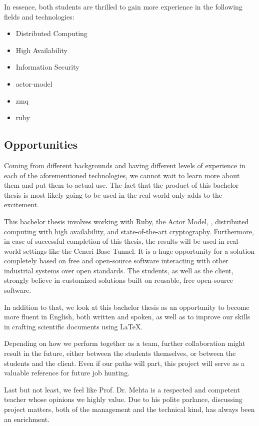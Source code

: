 In essence, both students are thrilled to gain more experience in the following
fields and technologies:

\begin{itemize}
	\item Distributed Computing
	\item High Availability
	\item Information Security
	\item \gls{actor-model}
	\item \gls{zmq}
	\item \gls{ruby}
\end{itemize}

\subsection{Opportunities}
Coming from different backgrounds and having different levels of experience in
each of the aforementioned technologies, we cannot wait to learn more about them and put
them to actual use. The fact that the product of this bachelor thesis is most
likely going to be used in the real world only adds to the excitement.

This bachelor thesis involves working with Ruby, the Actor Model, \zmq,
distributed computing with high availability, and state-of-the-art
cryptography. Furthermore, in case of successful completion of this thesis, the results will be used in real-world settings like the Ceneri
Base Tunnel. It is a huge opportunity for a solution completely based on free
and open-source software interacting with other industrial systems over open standards. The students, as well as the client, strongly believe
in customized solutions built on reusable, free open-source software.

In addition to that, we look at this bachelor thesis as an opportunity to
become more fluent in English, both written and spoken, as well as to improve
our skills in crafting scientific documents using {\LaTeX}.

Depending on how we perform together as a team, further collaboration might
result in the future, either between the students themselves, or between the
students and the client. Even if our paths will part, this project will
serve as a valuable reference for future job hunting.

Last but not least, we feel like Prof. Dr. Mehta is a respected and competent
teacher whose opinions we highly value. Due to his polite parlance, discussing
project matters, both of the management and the technical kind, has always been
an enrichment.

